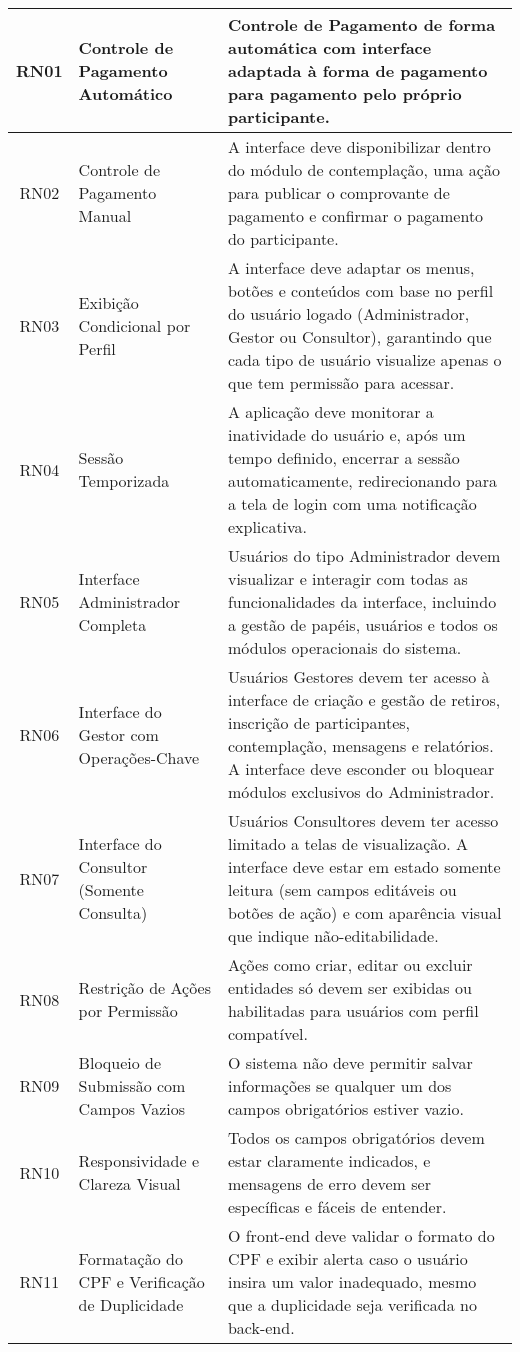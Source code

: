 \begin{longtable}{|c|>{\raggedright\arraybackslash}p{6cm}|>{\raggedright\arraybackslash}p{8cm}|}
\hline
\endlastfoot
RN01 & Controle de Pagamento Automático & Controle de Pagamento de forma automática com interface adaptada à forma de pagamento para pagamento pelo próprio participante. \\
\hline
RN02 & Controle de Pagamento Manual & A interface deve disponibilizar dentro do módulo de contemplação, uma ação para publicar o comprovante de pagamento e confirmar o pagamento do participante. \\
\hline
RN03 & Exibição Condicional por Perfil & A interface deve adaptar os menus, botões e conteúdos com base no perfil do usuário logado (Administrador, Gestor ou Consultor), garantindo que cada tipo de usuário visualize apenas o que tem permissão para acessar. \\
\hline
RN04 & Sessão Temporizada & A aplicação deve monitorar a inatividade do usuário e, após um tempo definido, encerrar a sessão automaticamente, redirecionando para a tela de login com uma notificação explicativa. \\
\hline
RN05 & Interface Administrador Completa & Usuários do tipo Administrador devem visualizar e interagir com todas as funcionalidades da interface, incluindo a gestão de papéis, usuários e todos os módulos operacionais do sistema. \\
\hline
RN06 & Interface do Gestor com Operações-Chave & Usuários Gestores devem ter acesso à interface de criação e gestão de retiros, inscrição de participantes, contemplação, mensagens e relatórios. A interface deve esconder ou bloquear módulos exclusivos do Administrador. \\
\hline
RN07 & Interface do Consultor (Somente Consulta) & Usuários Consultores devem ter acesso limitado a telas de visualização. A interface deve estar em estado somente leitura (sem campos editáveis ou botões de ação) e com aparência visual que indique não-editabilidade. \\
\hline
RN08 & Restrição de Ações por Permissão & Ações como criar, editar ou excluir entidades só devem ser exibidas ou habilitadas para usuários com perfil compatível. \\
\hline
RN09 & Bloqueio de Submissão com Campos Vazios & O sistema não deve permitir salvar informações se qualquer um dos campos obrigatórios estiver vazio. \\
\hline
RN10 & Responsividade e Clareza Visual & Todos os campos obrigatórios devem estar claramente indicados, e mensagens de erro devem ser específicas e fáceis de entender. \\
\hline
RN11 & Formatação do CPF e Verificação de Duplicidade & O front-end deve validar o formato do CPF e exibir alerta caso o usuário insira um valor inadequado, mesmo que a duplicidade seja verificada no back-end. \\

\end{longtable}
